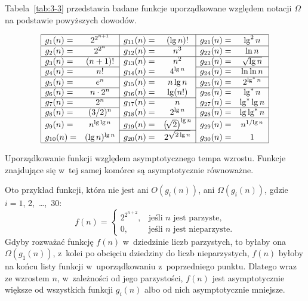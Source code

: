 Tabela~\ref{tab:3-3} przedstawia badane funkcje uporządkowane względem notacji $\Omega$ na podstawie powyższych dowodów.
\begin{table}[ht]
	\begin{center}
		\[
			\begin{array}{|lc|lc|lc|} \hline
				g_1(n)= & 2^{2^{n+1}} & g_{11}(n)= & (\lg n)! & g_{21}(n)= & \lg^2n \\ \hline
				g_2(n)= & 2^{2^n} & g_{12}(n)= & n^3 & g_{22}(n)= & \ln n \\ \hline
				g_3(n)= & (n+1)! & g_{13}(n)= & n^2 & g_{23}(n)= & \sqrt{\lg n} \\ \cline{1-2}\cline{5-6}
				g_4(n)= & n! & g_{14}(n)= & 4^{\lg n} & g_{24}(n)= & \ln\ln n \\ \hline
				g_5(n)= & e^n & g_{15}(n)= & n\lg n & g_{25}(n)= & 2^{\lg^*n} \\ \cline{1-2}\cline{5-6}
				g_6(n)= & n\cdot2^n & g_{16}(n)= & \lg(n!) & g_{26}(n)= & \lg^*n \\ \cline{1-4}
				g_7(n)= & 2^n & g_{17}(n)= & n & g_{27}(n)= & \lg^*\lg n \\ \cline{1-2}\cline{5-6}
				g_8(n)= & (3/2)^n & g_{18}(n)= & 2^{\lg n} & g_{28}(n)= & \lg\lg^*n \\ \hline
				g_9(n)= & n^{\lg\lg n} & g_{19}(n)= & \bigl(\!\sqrt{2}\bigr)^{\lg n} & g_{29}(n)= & n^{1/\!\lg n} \\ \cline{3-4}
				g_{10}(n)= & (\lg n)^{\lg n} & g_{20}(n)= & 2^{\sqrt{2\lg n}} & g_{30}(n)= & 1 \\ \hline
			\end{array}
		\]
	\end{center}
	\caption{Uporządkowanie funkcji względem asymptotycznego tempa wzrostu. Funkcje znajdujące się w~tej samej komórce są asymptotycznie równoważne.} \label{tab:3-3}
\end{table}

\subproblem %
Oto przykład funkcji, która nie jest ani $O(g_i(n))$, ani $\Omega(g_i(n))$, gdzie $i=1$, 2,~\dots,~30:
\[
	f(n) =
	\begin{cases}
		2^{2^{n+2}}, & \text{jeśli $n$ jest parzyste}, \\
		0, & \text{jeśli $n$ jest nieparzyste}.
	\end{cases}
\]
Gdyby rozważać funkcję $f(n)$ w~dziedzinie liczb parzystych, to byłaby ona $\Omega(g_1(n))$, z~kolei po obcięciu dziedziny do liczb nieparzystych, $f(n)$ byłoby na końcu listy funkcji w~uporządkowaniu z~poprzedniego punktu. Dlatego wraz ze wzrostem $n$, w~zależności od jego parzystości, $f(n)$ jest asymptotycznie większe od wszystkich funkcji $g_i(n)$ albo od nich asymptotycznie mniejsze.

